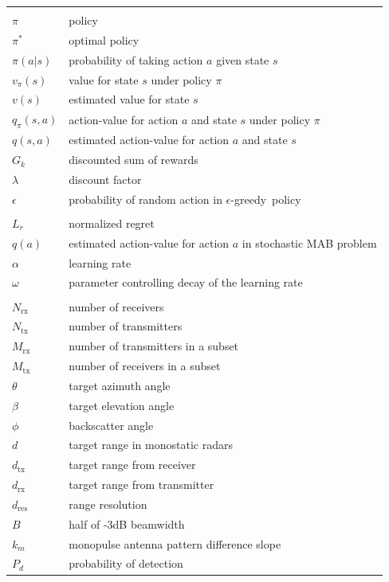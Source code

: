 \documentclass[english, 12pt, a4paper, elec, utf8, a-1b, online]{aaltothesis}
\newcommand{\egreedy}{$\epsilon$-greedy~}
\newcommand{\regret}{L_r}
\begin{document}
\begin{longtable}{ll}
&\\
$\pi$ & policy \\
$\pi^*$ & optimal policy \\
$\pi(a|s)$ & probability of taking action $a$ given state $s$ \\
$v_\pi(s)$ & value for state $s$ under policy $\pi$ \\
$v(s)$ & estimated value for state $s$ \\
$q_\pi(s, a)$ & action-value for action $a$ and state $s$ under policy $\pi$ \\
$q(s, a)$ & estimated action-value for action $a$ and state $s$ \\
$G_k$ & discounted sum of rewards \\
$\lambda$ & discount factor \\
$\epsilon$ & probability of random action in \egreedy policy \\
&\\
$\regret$ & normalized regret \\
$q(a)$ & estimated action-value for action $a$ in stochastic MAB problem \\
$\alpha$ & learning rate \\
$\omega$ & parameter controlling decay of the learning rate \\ 
&\\
$N_\text{rx}$ & number of receivers \\
$N_\text{tx}$ & number of transmitters \\
$M_\text{rx}$ & number of transmitters in a subset \\
$M_\text{tx}$ & number of receivers in a subset \\
$\theta$ & target azimuth angle \\
$\beta$ & target elevation angle \\
$\phi$ & backscatter angle \\
$d$ & target range in monostatic radars \\
$d_\text{tx}$ & target range from receiver \\
$d_\text{rx}$ & target range from transmitter \\
$d_\text{res}$ & range resolution \\
$B$ & half of -3dB beamwidth \\
$k_m$ & monopulse antenna pattern difference slope \\
$P_d$ & probability of detection \\

\end{longtable}
\end{document}
